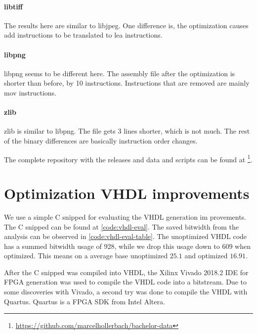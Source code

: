 \paragraph{libtiff} The results here are similar to libjpeg. One difference is, the optimization causes add instructions to be translated to lea instructions. 

\paragraph{libpng} libpng seems to be different here. The assembly file after the optimization is shorter than before, by 10 instructions. Instructions that are removed are mainly mov instructions.

\paragraph{zlib} zlib is similar to libpng. The file gets 3 lines shorter, which is not much. The rest of the binary differences are basically instruction order changes.

The complete repository with the releases and data and scripts can be found at \footnote{\url{https://github.com/marcelhollerbach/bachelor-data}}.

\section{Optimization VHDL improvements}


We use a simple C snipped for evaluating the VHDL generation im provements. The C snipped can be found at \autoref{code:vhdl-eval}. The saved bitwidth from the analysis can be observed in \autoref{code:vhdl-eval-table}. The unoptimized VHDL code has a summed bitwidth usage of 928, while we drop this usage down to 609 when optimized. This means on a average base unoptimized $25.1$ and optimized $16.91$.

After the C snipped was compiled into VHDL, the Xilinx Vivado 2018.2 IDE for FPGA generation was used to compile the VHDL code into a bitstream. Due to some discoveries with Vivado, a second try was done to compile the VHDL with Quartus. Quartus is a FPGA SDK from Intel Altera.

